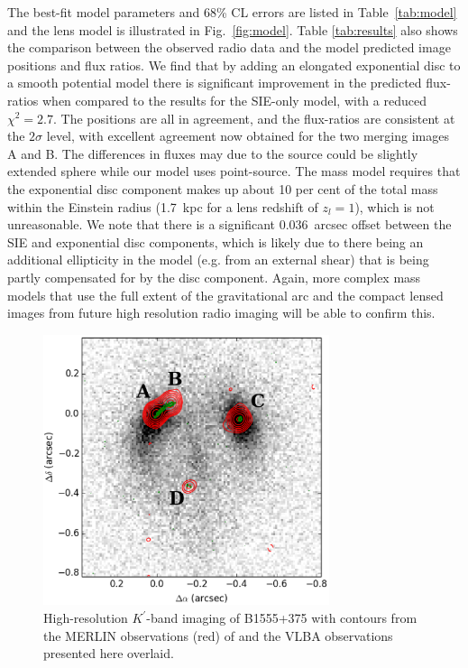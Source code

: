 \documentclass[a4paper,fleqn,usenatbib,useAMS]{mnras}
\begin{document}
The best-fit model parameters and 68\% CL errors are listed in Table~\ref{tab:model} and the lens model is illustrated in Fig.~\ref{fig:model}. Table \ref{tab:results} also shows the comparison between the observed radio data and the model predicted image positions and flux ratios. We find that by adding an elongated exponential disc to a smooth potential model there is significant improvement in the predicted flux-ratios when compared to the results for the SIE-only model, with a reduced $\chi^2 = 2.7$. The positions are all in agreement, and the flux-ratios are consistent at the $2\sigma$ level, with excellent agreement now obtained for the two merging images A and B. The differences in fluxes may due to the source could be slightly extended sphere while our model uses point-source. The mass model requires that the exponential disc component makes up about 10 per cent of the total mass within the Einstein radius (1.7~kpc for a lens redshift of $z_l = 1$), which is not unreasonable. We note that there is a significant 0.036~arcsec offset between the SIE and exponential disc components, which is likely due to there being an additional ellipticity in the model (e.g. from an external shear) that is being partly compensated for by the disc component. Again, more complex mass models that use the full extent of the gravitational arc and the compact lensed images from future high resolution radio imaging will be able to confirm this.

\begin{figure}
\includegraphics[width=84mm]{fig2_twocontour_g.eps}
\caption{High-resolution $K^\prime$-band imaging of B1555+375 with contours from the MERLIN observations (red) of \citet{Marlow99} and the VLBA observations presented here overlaid.}
\label{fig:merlin}
\end{figure}
\end{document}
